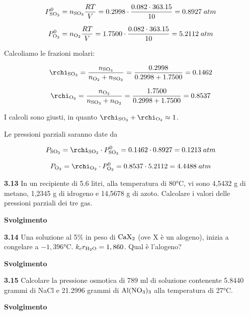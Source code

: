 $$P^0_{\rm SO_3}=n_{\rm SO_3} \displaystyle \frac{RT}{V}
=0.2998 \cdot \frac{0.082 \cdot 363.15}{10}
=0.8927\;atm$$

$$P^0_{\rm O_2}=n_{\rm O_2} \displaystyle \frac{RT}{V}
=1.7500 \cdot \frac{0.082 \cdot 363.15}{10}
=5.2112\;atm$$

Calcoliamo le frazioni molari:

$$\rchi_{\rm SO_3}=\frac{n_{\rm SO_3}}{n_{\rm O_2} + n_{\rm SO_3}}=\frac{0.2998}{0.2998 + 1.7500}=0.1462$$

$$\rchi_{\rm O_2}=\frac{n_{\rm O_2}}{n_{\rm SO_3} + n_{\rm O_2}}=\frac{1.7500}{0.2998 + 1.7500}=0.8537$$

I calcoli sono giusti, in quanto $\rchi_{\rm SO_3} + \rchi_{\rm O_2} \approx 1$.

Le pressioni parziali saranno date da

$$P_{\rm SO_3}=\rchi_{\rm SO_3} \cdot P^0_{\rm SO_3}
=0.1462 \cdot 0.8927=0.1213\;atm$$

$$P_{\rm O_2}=\rchi_{\rm O_2} \cdot P^0_{\rm O_2}
=0.8537 \cdot 5.2112=4.4488\;atm$$

\vspace{0.2cm}\textbf{3.13} In un recipiente di 5.6 litri, alla temperatura di 80°C, vi sono 4,5432 g di metano, 1,2345 g di idrogeno e 14,5678 g di azoto. Calcolare i valori delle pressioni parziali dei tre gas. 

\vspace{0.2cm}\large\textbf{Svolgimento}\normalsize

\vspace{0.2cm}

\vspace{0.2cm}\textbf{3.14} Una soluzione al 5\% in peso di $\rm CaX_2$ (ove X è un alogeno), inizia a congelare a $-1,396$°C. $k_cr_{\rm H_2O} = 1,860$. Qual è l'alogeno? 

\vspace{0.2cm}\large\textbf{Svolgimento}\normalsize

\vspace{0.2cm}

\vspace{0.2cm}\textbf{3.15} Calcolare la pressione osmotica di 789 ml di soluzione contenente 5.8440 grammi di NaCl e  21.2996 grammi di $\rm Al(NO_3)_3$ alla temperatura di 27°C.

\vspace{0.2cm}\large\textbf{Svolgimento}\normalsize

\vspace{0.2cm}

